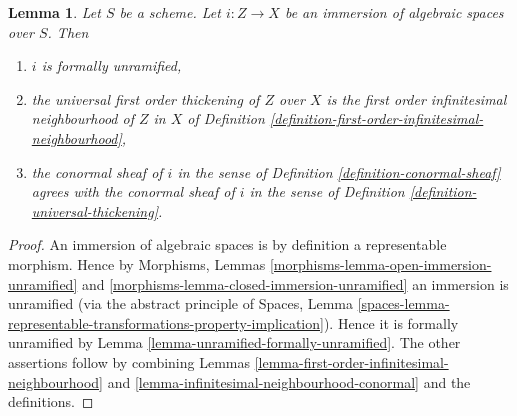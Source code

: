\documentclass[10pt,a4paper]{amsart}
\theoremstyle{plain}
\newtheorem{lemma}[subsection]{Lemma}
\theoremstyle{definition}
\theoremstyle{remark}
\numberwithin{equation}{subsection}
\begin{document}
\begin{lemma}
\label{lemma-immersion-universal-thickening}
Let $S$ be a scheme.
Let $i : Z \to X$ be an immersion of algebraic spaces over $S$. Then
\begin{enumerate}
\item $i$ is formally unramified,
\item the universal first order thickening of $Z$ over $X$ is the first order
infinitesimal neighbourhood of $Z$ in $X$ of
Definition \ref{definition-first-order-infinitesimal-neighbourhood},
\item the conormal sheaf of $i$ in the sense of
Definition \ref{definition-conormal-sheaf}
agrees with the conormal sheaf of $i$ in the sense of
Definition \ref{definition-universal-thickening}.
\end{enumerate}
\end{lemma}

\begin{proof}
An immersion of algebraic spaces is by definition a representable morphism.
Hence by
Morphisms, Lemmas \ref{morphisms-lemma-open-immersion-unramified} and
\ref{morphisms-lemma-closed-immersion-unramified}
an immersion is unramified (via the abstract principle of
Spaces, Lemma
\ref{spaces-lemma-representable-transformations-property-implication}).
Hence it is formally unramified by
Lemma \ref{lemma-unramified-formally-unramified}.
The other assertions follow by combining
Lemmas \ref{lemma-first-order-infinitesimal-neighbourhood} and
\ref{lemma-infinitesimal-neighbourhood-conormal}
and the definitions.
\end{proof}
\end{document}
